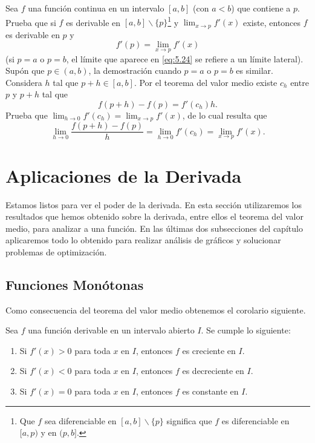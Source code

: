 \documentclass[12pt,a4paper]{book}
\begin{document}
    \begin{ejercicio}\label{ej:268}
        Sea $f$ una función continua en un intervalo $[a,b]$ (con $a<b$)
        que contiene a $p$. Prueba que si $f$ es derivable en $[a,b]\backslash\{p\}$\footnote{Que $f$ sea diferenciable en $[a,b]\backslash\{p\}$ significa que $f$ es diferenciable en $[a,p)$ y en $(p,b]$.} y $\lim_{x\to p}f'(x)$
        existe, entonces $f$ es derivable en $p$ y
        \begin{equation}\label{eq:5.24}
            f'(p)=\lim_{x\to p}f'(x)
        \end{equation}
        (si $p=a$ o $p=b$, el límite que aparece en \eqref{eq:5.24} se refiere a un límite lateral).
        \sugerencia Supón que $p\in(a,b)$, la demostración cuando $p=a$ o $p=b$
        es similar. Considera $h$ tal que $p+h\in[a,b]$. Por el teorema del valor medio
        existe $c_{h}$ entre $p$ y $p+h$ tal que
        \begin{equation*}
            f(p+h)-f(p)=f'(c_{h})h.
        \end{equation*}
        Prueba que $\lim_{h\to 0}f'(c_{h})=\lim_{x\to p}f'(x)$, de lo cual resulta que
        \begin{equation*}
            \lim_{h\to 0}\frac{f(p+h)-f(p)}{h}=\lim_{h\to 0}f'(c_{h})=\lim_{x\to p}f'(x).
        \end{equation*}
    \end{ejercicio}

    \section{Aplicaciones de la Derivada}\label{sec:aplicaciones-derivada}

    Estamos listos para ver el poder de la derivada. En esta sección utilizaremos
    los resultados que hemos obtenido sobre la derivada, entre ellos el
    teorema del valor medio, para analizar a una función. En las últimas dos
    subsecciones del capítulo aplicaremos todo lo obtenido para realizar análisis
    de gráficos y solucionar problemas de optimización.

    \subsection{Funciones Monótonas}\label{subsec:monotonas-derivada}

    Como consecuencia del teorema del valor medio obtenemos el corolario
    siguiente.

    \begin{corolario}\label{cor:2}
        Sea $f$ una función derivable en un intervalo abierto $I$. Se
        cumple lo siguiente:
        \begin{enumerate}[nosep]
            \item Si $f'(x)>0$ para toda $x$ en $I$, entonces $f$ es creciente en $I$.
            \item Si $f'(x)<0$ para toda $x$ en $I$, entonces $f$ es decreciente en $I$.
            \item Si $f'(x)=0$ para toda $x$ en $I$, entonces $f$ es constante en $I$.
        \end{enumerate}
    \end{corolario}
\end{document}
